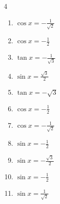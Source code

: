 \begin{multicols}{4}
\begin{enumerate}
  \item $\displaystyle \cos{x}  = -\frac{1}{\sqrt{2}}$


  \item $\displaystyle \cos{x}  = -\frac{1}{2}$


  \item $\displaystyle \tan{x}  = -\frac{1}{\sqrt{3}}$


  \item $\displaystyle \sin{x}  = \frac{\sqrt{3}}{2}$


  \item $\displaystyle \tan{x}  = -\sqrt{3}$


  \item $\displaystyle \cos{x}  = -\frac{1}{2}$


  \item $\displaystyle \cos{x}  = -\frac{1}{\sqrt{2}}$


  \item $\displaystyle \sin{x}  = -\frac{1}{2}$


  \item $\displaystyle \sin{x}  = -\frac{\sqrt{3}}{2}$


  \item $\displaystyle \sin{x}  = -\frac{1}{2}$


  \item $\displaystyle \sin{x}  = \frac{1}{\sqrt{2}}$



\end{enumerate}
\end{multicols}
